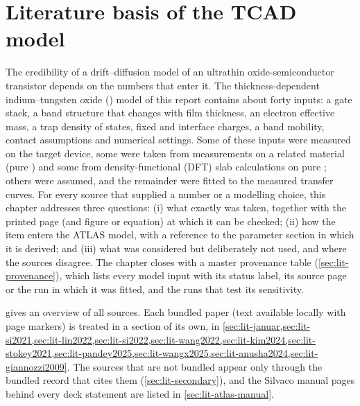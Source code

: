 \chapter{Literature basis of the TCAD model}\label{ch:literature}

The credibility of a drift--diffusion model of an ultrathin oxide-semiconductor transistor depends
on the numbers that enter it. The thickness-dependent indium--tungsten oxide (\IWO) model of this
report contains about forty inputs: a gate stack, a band structure that changes with film thickness,
an electron effective mass, a trap density of states, fixed and interface charges, a band mobility,
contact assumptions and numerical settings. Some of these inputs were measured on the target device,
some were taken from measurements on a related material (pure \InO{}) and some from
density-functional (DFT) slab calculations on pure \InO{}; others were assumed, and the remainder
were fitted to the measured transfer curves. For every source that supplied a number or a modelling
choice, this chapter addresses three questions: (i) what exactly was taken, together with the printed
page (and figure or equation) at which it can be checked; (ii) how the item enters the ATLAS model,
with a reference to the parameter section in which it is derived; and (iii) what was considered but
deliberately not used, and where the sources disagree. The chapter closes with a master provenance
table (\cref{sec:lit-provenance}), which lists every model input with its status label, its source
page or the run in which it was fitted, and the runs that test its sensitivity.

 gives an overview of all sources. Each bundled paper (text available locally
with page markers) is treated in a section of its own, in
\cref{sec:lit-januar,sec:lit-si2021,sec:lit-lin2022,sec:lit-si2022,sec:lit-wang2022,sec:lit-kim2024,sec:lit-stokey2021,sec:lit-pandey2025,sec:lit-wangx2025,sec:lit-anusha2024,sec:lit-giannozzi2009}.
The sources that are not bundled appear only through the bundled record that cites them
(\cref{sec:lit-secondary}), and the Silvaco manual pages behind every deck statement are listed in
\cref{sec:lit-atlas-manual}.


